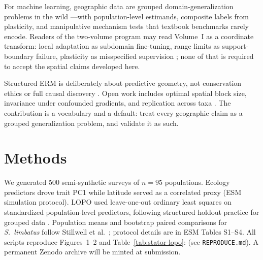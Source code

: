\documentclass[11pt]{article}
\begin{document}
For machine learning, geographic data are grouped domain-generalization
problems in the wild \citep{koh2021,arjovsky2019}---with population-level
estimands, composite labels from plasticity, and manipulative mechanism tests
that textbook benchmarks rarely encode.  Readers of the two-volume program
may read Volume~I as a coordinate transform: local adaptation as subdomain
fine-tuning, range limits as support-boundary failure, plasticity as
misspecified supervision \citep{stillwell2026a}; none of that is required
to accept the spatial claims developed here.

Structured ERM is deliberately about predictive geometry, not conservation
ethics or full causal discovery \citep{pearl2009}.  Open work includes
optimal spatial block size, invariance under confounded gradients, and
replication across taxa \citep{roberts2017,ploton2020}.  The contribution is
a vocabulary and a default: treat every geographic claim as a grouped
generalization problem, and validate it as such.

\section{Methods}
\label{sec:methods}

We generated 500 semi-synthetic surveys of $n=95$ populations.  Ecology
predictors drove trait PC1 while latitude served as a correlated proxy
(ESM simulation protocol).  LOPO used leave-one-out ordinary least squares on
standardized population-level predictors, following structured holdout
practice for grouped data \citep{roberts2017,varoquaux2018}.  Population means
and bootstrap paired comparisons for \emph{S.\ limbatus} follow Stillwell
et al.\ \citep{stillwell2007}; protocol details are in ESM Tables S1--S4.
All scripts reproduce Figures~1--2 and Table~\ref{tab:stator-lopo}:
\repoUrl{} (see \texttt{REPRODUCE.md}).  A permanent Zenodo archive will be
minted at submission.



\end{document}
